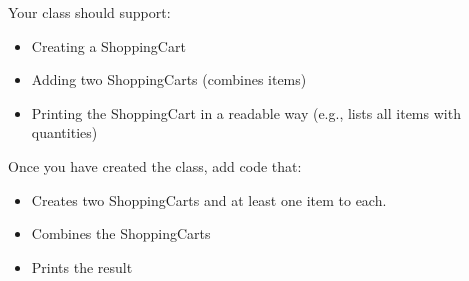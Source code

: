 		Your class should support:
		\begin{itemize}
			\item Creating a ShoppingCart
			\item Adding two ShoppingCarts (combines items)
			\item Printing the ShoppingCart in a readable way 
				(e.g., lists all items with quantities)
		\end{itemize}
		
		Once you have created the class, add code that:
		\begin{itemize}
			\item Creates two ShoppingCarts and at least one item to each.
			\item Combines the ShoppingCarts
			\item Prints the result
		\end{itemize}


